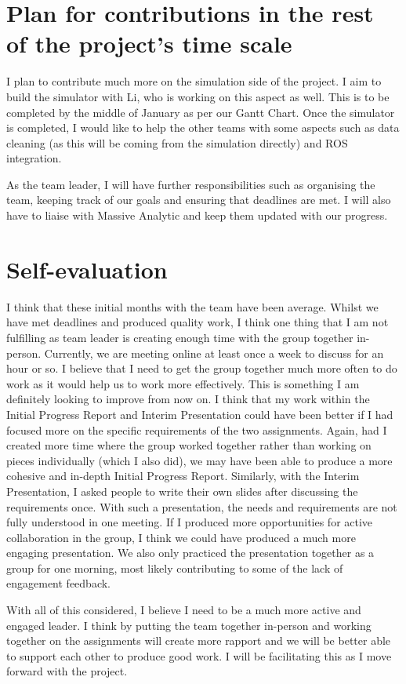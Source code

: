 \documentclass[11pt]{article}
\begin{document}
\section{Plan for contributions in the rest of the project's time scale}
I plan to contribute much more on the simulation side of the project. I aim to build the simulator with Li, who is working on this aspect as well. This is to be completed by the middle of January as per our Gantt Chart. Once the simulator is completed, I would like to help the other teams with some aspects such as data cleaning (as this will be coming from the simulation directly) and ROS integration.

As the team leader, I will have further responsibilities such as organising the team, keeping track of our goals and ensuring that deadlines are met. I will also have to liaise with Massive Analytic and keep them updated with our progress.
\section{Self-evaluation}
I think that these initial months with the team have been average. Whilst we have met deadlines and produced quality work, I think one thing that I am not fulfilling as team leader is creating enough time with the group together in-person. Currently, we are meeting online at least once a week to discuss for an hour or so. I believe that I need to get the group together much more often to do work as it would help us to work more effectively. This is something I am definitely looking to improve from now on. I think that my work within the Initial Progress Report and Interim Presentation could have been better if I had focused more on the specific requirements of the two assignments. Again, had I created more time where the group worked together rather than working on pieces individually (which I also did), we may have been able to produce a more cohesive and in-depth Initial Progress Report. Similarly, with the Interim Presentation, I asked people to write their own slides after discussing the requirements once. With such a presentation, the needs and requirements are not fully understood in one meeting. If I produced more opportunities for active collaboration in the group, I think we could have produced a much more engaging presentation. We also only practiced the presentation together as a group for one morning, most likely contributing to some of the lack of engagement feedback.

With all of this considered, I believe I need to be a much more active and engaged leader. I think by putting the team together in-person and working together on the assignments will create more rapport and we will be better able to support each other to produce good work. I will be facilitating this as I move forward with the project.
\end{document}
